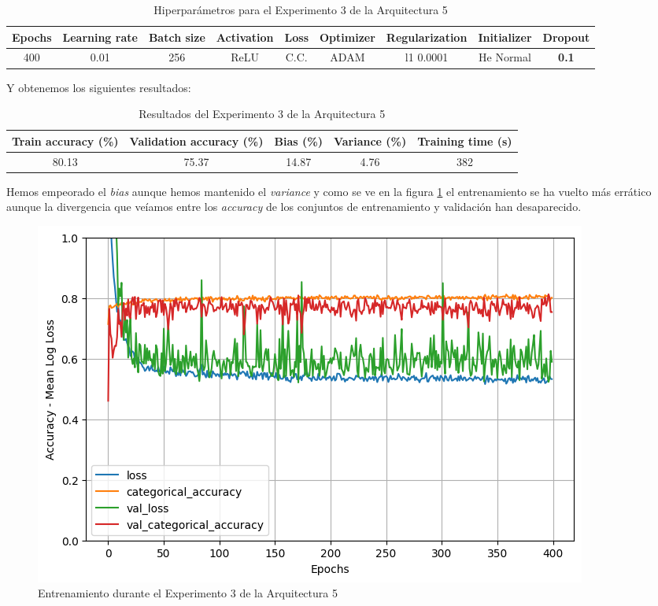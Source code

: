 \documentclass{article}
\begin{document}
			\begin{table}[!h]
				\begin{center}
					\begin{tabular}{| c | c | c | c | c | c | c | c | c |}
						\textbf{Epochs} & \textbf{Learning rate} & \textbf{Batch size} & \textbf{Activation} & \textbf{Loss} & \textbf{Optimizer} & \textbf{Regularization} & \textbf{Initializer} & \textbf{Dropout}\\ \hline
						 400 & 0.01 & 256 & ReLU & C.C. & ADAM & l1 0.0001 & He Normal & \textbf{0.1}
					\end{tabular}
					\caption{Hiperpar\'ametros para el Experimento 3 de la Arquitectura 5}
					\label{tab:hip-d-a5-e3}
				\end{center}
			\end{table}
			Y obtenemos los siguientes resultados:
			\begin{table}[!h]
				\begin{center}
					\begin{tabular}{| c | c | c | c | c |}
						\textbf{Train accuracy (\%)} & \textbf{Validation accuracy (\%)} & \textbf{Bias (\%)} & \textbf{Variance (\%)} & \textbf{Training time (s)} \\ \hline
						80.13 & 75.37 & 14.87 & 4.76 & 382\\ \hline
					\end{tabular}
					\caption{Resultados del Experimento 3 de la Arquitectura 5}
					\label{tab:res-d-a5-e3}
				\end{center}
			\end{table}
		    
		    Hemos empeorado el \textit{bias} aunque hemos mantenido el \textit{variance} y como se ve en la figura \ref{d-tr-a5-e3} el entrenamiento se ha vuelto m\'as err\'atico aunque la divergencia que ve\'iamos entre los \textit{accuracy} de los conjuntos de entrenamiento y validaci\'on han desaparecido.
		    
			\begin{figure}[!h]
				\begin{center}
					\includegraphics[scale=0.5]{d-tr-a5-e3.png}		
					\caption{Entrenamiento durante el Experimento 3 de la Arquitectura 5}	
					\label{d-tr-a5-e3}
				\end{center}
			\end{figure}
		
\end{document}
